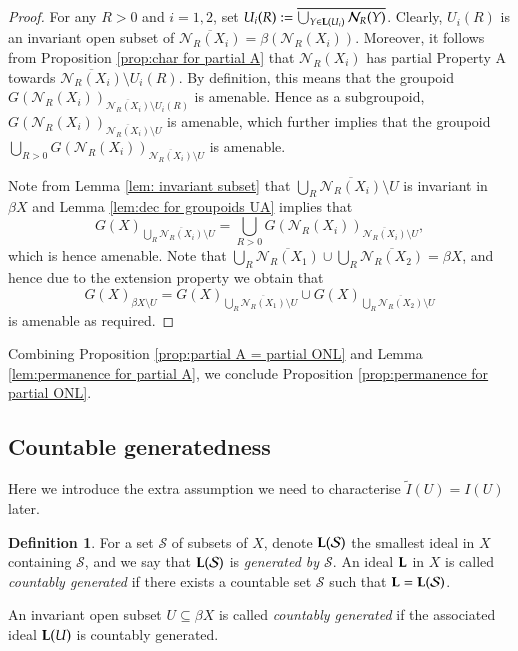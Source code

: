 \documentclass[12pt, a4paper]{amsart}
\numberwithin{equation}{section}
\theoremstyle{definition}
\newtheorem{defn}[thm]{Definition}
\theoremstyle{remark}
\def\L{\mathcal{L}}
\def\Nd{\mathcal{N}}
\def\S{\mathcal{S}}
\def\L{{\bf L}}
\begin{document}
\begin{proof}
For any $R>0$ and $i=1,2$, set $U_i(R):=\overline{\bigcup_{Y \in \L(U_i)} \Nd_R(Y)}$. Clearly, $U_i(R)$ is an invariant open subset of $\overline{\Nd_R(X_i)} = \beta (\Nd_R(X_i))$. Moreover, it follows from Proposition \ref{prop:char for partial A} that $\Nd_R(X_i)$ has partial Property A towards $\overline{\Nd_R(X_i)} \setminus U_i(R)$. By definition, this means that the groupoid $G(\Nd_R(X_i))_{\overline{\Nd_R(X_i)} \setminus U_i(R)}$ is amenable. Hence as a subgroupoid, $G(\Nd_R(X_i))_{\overline{\Nd_R(X_i)} \setminus U}$ is amenable, which further implies that the groupoid $\bigcup_{R>0}G(\Nd_R(X_i))_{\overline{\Nd_R(X_i)} \setminus U}$ is amenable.

Note from Lemma \ref{lem: invariant subset} that $\bigcup_R \overline{\Nd_R(X_i)}\setminus U$ is invariant in $\beta X$ and Lemma \ref{lem:dec for groupoids UA} implies that 
\[
G(X)_{\bigcup_R \overline{\Nd_R(X_i)}\setminus U} = \bigcup_{R>0} G(\Nd_R(X_i))_{\overline{\Nd_R(X_i)} \setminus U},
\]
which is hence amenable. Note that $\bigcup_R \overline{\Nd_R(X_1)} \cup \bigcup_R \overline{\Nd_R(X_2)} = \beta X$, and hence due to the extension property we obtain that
\[
G(X)_{\beta X \setminus U} = G(X)_{\bigcup_R \overline{\Nd_R(X_1)}\setminus U} \cup G(X)_{\bigcup_R \overline{\Nd_R(X_2)}\setminus U}
\]
is amenable as required.
\end{proof}

Combining Proposition \ref{prop:partial A = partial ONL} and Lemma \ref{lem:permanence for partial A}, we conclude Proposition \ref{prop:permanence for partial ONL}. 


\subsection{Countable generatedness}

Here we introduce the extra assumption we need to characterise $\tilde{I}(U) = I(U)$ later. 

\begin{defn}\label{defn:countably generated}
For a set $\S$ of subsets of $X$, denote $\L(\S)$ the smallest ideal in $X$ containing $\S$, and we say that $\L(\S)$ is \emph{generated by $\S$}. An ideal $\L$ in $X$ is called \emph{countably generated} if there exists a countable set $\S$ such that $\L=\L(\S)$. 

An invariant open subset $U \subseteq \beta X$ is called \emph{countably generated} if the associated ideal $\L(U)$ is countably generated.
\end{defn}
\end{document}
